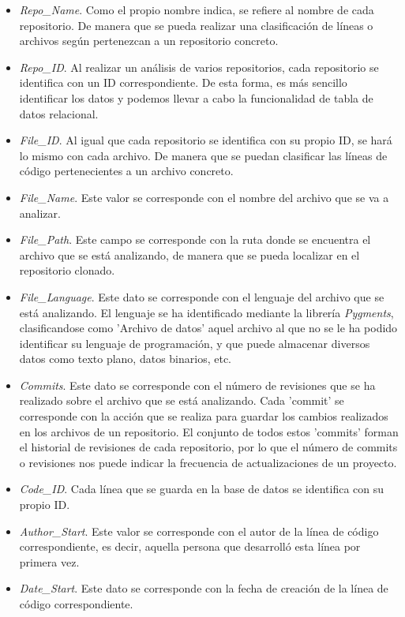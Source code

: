 \documentclass[a4paper, 12pt]{book}
\begin{document}
\begin{itemize}
  \item \textit{Repo\_Name}. Como el propio nombre indica, se refiere al nombre de cada repositorio. De manera que se pueda realizar una clasificación de líneas o archivos según pertenezcan a un repositorio concreto.
  \item \textit{Repo\_ID}. Al realizar un análisis de varios repositorios, cada repositorio se identifica con un ID correspondiente. De esta forma, es más sencillo identificar los datos y podemos llevar a cabo la funcionalidad
  de tabla de datos relacional.
  \item \textit{File\_ID}. Al igual que cada repositorio se identifica con su propio ID, se hará lo mismo con cada archivo. De manera que se puedan clasificar las líneas de código pertenecientes a un archivo concreto.
  \item \textit{File\_Name}. Este valor se corresponde con el nombre del archivo que se va a analizar.
  \item \textit{File\_Path}. Este campo se corresponde con la ruta donde se encuentra el archivo que se está analizando, de manera que se pueda localizar en el repositorio clonado.
  \item \textit{File\_Language}. Este dato se corresponde con el lenguaje del archivo que se está analizando. El lenguaje se ha identificado mediante la librería \textit{Pygments}, clasificandose como 'Archivo de datos' aquel
  archivo al que no se le ha podido identificar su lenguaje de programación, y que puede almacenar diversos datos como texto plano, datos binarios, etc. 
  \item \textit{Commits}. Este dato se corresponde con el número de revisiones que se ha realizado sobre el archivo que se está analizando. Cada 'commit' se corresponde con la acción que se realiza para guardar los cambios realizados en los archivos de 
  un repositorio. El conjunto de todos estos 'commits' forman el historial de revisiones de cada repositorio, por lo que el número de commits o revisiones nos puede indicar la frecuencia de actualizaciones de un proyecto.
  \item \textit{Code\_ID}. Cada línea que se guarda en la base de datos se identifica con su propio ID.
  \item \textit{Author\_Start}. Este valor se corresponde con el autor de la línea de código correspondiente, es decir, aquella persona que desarrolló esta línea por primera vez.
  \item \textit{Date\_Start}. Este dato se corresponde con la fecha de creación de la línea de código correspondiente.

\end{itemize}
\end{document}
